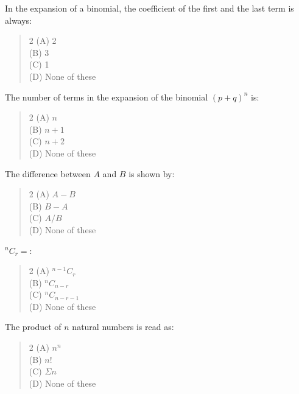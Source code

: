 \documentclass[11pt,a4paper]{article}
\begin{document}
\begin{mcqlist}
\item In the expansion of a binomial, the coefficient of the first and the last term is always:
\begin{quote}\begin{multicols}{2}
\noindent (A) 2 \\
(B) 3 \\
(C) 1 \\
(D) None of these
\end{multicols}\end{quote}

\item The number of terms in the expansion of the binomial $(p+q)^n$ is:
\begin{quote}\begin{multicols}{2}
\noindent (A) $n$ \\
(B) $n+1$ \\
(C) $n+2$ \\
(D) None of these
\end{multicols}\end{quote}

\item The difference between $A$ and $B$ is shown by:
\begin{quote}\begin{multicols}{2}
\noindent (A) $A-B$ \\
(B) $B-A$ \\
(C) $A/B$ \\
(D) None of these
\end{multicols}\end{quote}

\item ${}^{n}C_r=$\underline{\hspace{1cm}}:
\begin{quote}\begin{multicols}{2}
\noindent (A) ${}^{n-1}C_r$ \\
(B) ${}^{n}C_{n-r}$ \\
(C) ${}^{n}C_{n-r-1}$ \\
(D) None of these
\end{multicols}\end{quote}

\item The product of $n$ natural numbers is read as:
\begin{quote}\begin{multicols}{2}
\noindent (A) $n^n$ \\
(B) $n!$ \\
(C) $\Sigma n$ \\
(D) None of these
\end{multicols}\end{quote}


\end{mcqlist}
\end{document}
